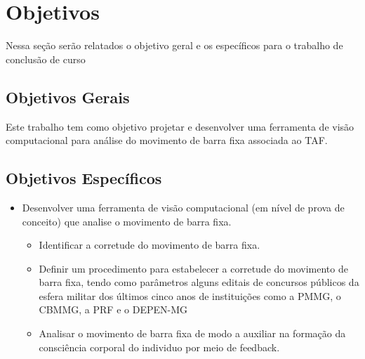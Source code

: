 \section{Objetivos}
Nessa seção serão relatados o objetivo geral e os específicos para o trabalho de
conclusão de curso

\subsection{Objetivos Gerais}	
 Este trabalho tem como objetivo projetar e desenvolver uma  ferramenta de visão computacional para análise do movimento de barra fixa associada ao \ac{TAF}.
 
\subsection{Objetivos Específicos}	
\begin{itemize}

    \item Desenvolver uma ferramenta de visão computacional (em nível de prova de conceito) que analise o movimento de barra fixa.
    
    \begin{itemize}
        \item Identificar a corretude do movimento de barra fixa.
        \item Definir um procedimento para estabelecer a corretude do movimento de barra fixa, tendo como parâmetros alguns editais de concursos públicos da esfera militar dos últimos cinco anos de instituições como a \ac{PMMG}, o \ac{CBMMG}, a \ac{PRF} e o \ac{DEPEN-MG}
        \item Analisar o movimento de barra fixa de modo a auxiliar na formação da consciência corporal do individuo por meio de feedback.
    \end{itemize}

    
\end{itemize}


 